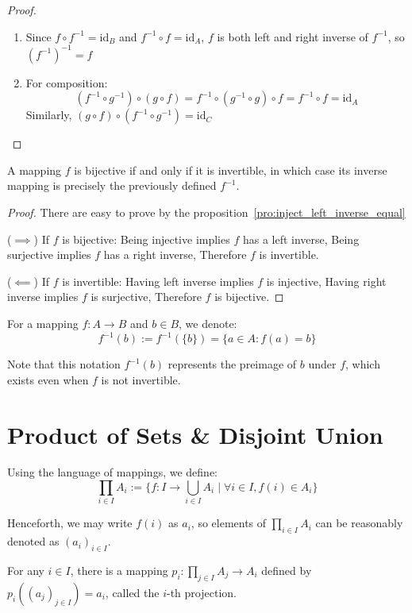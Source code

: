 \begin{proof}
  \begin{enumerate}
    \item Since $f \circ f^{-1} = \text{id}_B$ and $f^{-1} \circ f = \text{id}_A$,
      $f$ is both left and right inverse of $f^{-1}$, so $(f^{-1})^{-1} = f$

    \item For composition:
      \[
        (f^{-1} \circ g^{-1}) \circ (g \circ f) = f^{-1} \circ (g^{-1} \circ g) \circ f = f^{-1} \circ f = \text{id}_A
      \]
      Similarly, $(g \circ f) \circ (f^{-1} \circ g^{-1}) = \text{id}_C$
  \end{enumerate}
\end{proof}

\begin{proposition}
  A mapping $f$ is bijective if and only if it is invertible, in which case its inverse mapping is precisely the previously defined $f^{-1}$.
\end{proposition}

\begin{proof} There are easy to prove by the proposition~\ref{pro:inject_left_inverse_equal}

  ($\implies$) If $f$ is bijective: Being injective implies $f$ has a left inverse, Being surjective implies $f$ has a right inverse, Therefore $f$ is invertible.

  ($\impliedby$) If $f$ is invertible: Having left inverse implies $f$ is injective, Having right inverse implies $f$ is surjective, Therefore $f$ is bijective.
\end{proof}

\begin{definition}[Preimage]
  For a mapping $f : A \to B$ and $b \in B$, we denote:
  \[
    f^{-1}(b) := f^{-1}(\{b\}) = \{a \in A : f(a) = b\}
  \]
\end{definition}

\begin{remark}
  Note that this notation $f^{-1}(b)$ represents the preimage of $b$ under $f$, which exists even when $f$ is not invertible.
\end{remark}

\section{Product of Sets \& Disjoint Union}

\begin{definition}
  Using the language of mappings, we define:
  \[
    \prod_{i \in I} A_i := \{f : I \to \bigcup_{i \in I} A_i \mid \forall i \in I, f(i) \in A_i\}
  \]

  Henceforth, we may write $f(i)$ as $a_i$, so elements of $\prod_{i \in I} A_i$ can be reasonably denoted as $(a_i)_{i \in I}$.

  For any $i \in I$, there is a mapping $p_i : \prod_{j \in I} A_j \to A_i$ defined by $p_i((a_j)_{j \in I}) = a_i$, called the $i$-th projection.
\end{definition}

